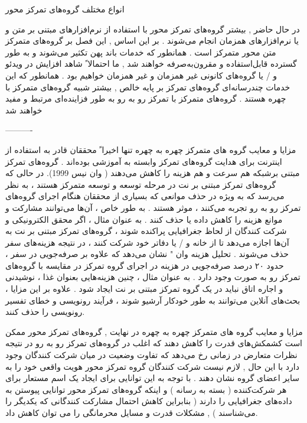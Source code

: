 \documentclass{beamer}
\begin{document}
\begin{persian}
\begin{frame}{انواع مختلف گروه‌های تمرکز محور}

در حال حاضر , بیشتر گروه‌های تمرکز محور با استفاده از نرم‌افزارهای مبتنی بر متن و یا نرم‌افزارهای همزمان انجام می‌شوند . بر این اساس , این فصل بر گروه‌های متمرکز متن محور متمرکز است . همانطور که خدمات باند پهن تکثیر می‌شوند و به طور گسترده قابل‌استفاده و مقرون‌به‌صرفه خواهند شد , ما احتمالا ً شاهد افزایش در ویدئو و / یا گروه‌های کانونی غیر همزمان و غیر همزمان خواهیم بود . همانطور که این خدمات چندرسانه‌ای گروه‌های تمرکز بر پایه خالص , بیشتر شبیه گروه‌های متمرکز با چهره هستند . گروه‌های متمرکز با تمرکز رو به رو به طور فزاینده‌ای مرتبط و مفید خواهند شد


\end{frame}

----------
\begin{frame}{مزایا و معایب گروه های متمرکز چهره به چهره }
تنها اخیرا ً محققان قادر به استفاده از اینترنت برای هدایت گروه‌های تمرکز وابسته به آموزشی بوده‌اند . گروه‌های تمرکز مبتنی برشبکه هم سرعت و هم هزینه را کاهش می‌دهند ( وان نیس 1999). در حالی که گروه‌های تمرکز مبتنی بر نت در مرحله توسعه و توسعه متمرکز هستند ، به نظر می‌رسد که به ویژه در حذف موانعی که بسیاری از محققان هنگام اجرای گروه‌های تمرکز رو به رو تجربه می‌کنند ، موثر هستند . به طور خاص ، آن‌ها می‌توانند مشارکت و موانع هزینه را کاهش داده یا حذف کنند . به عنوان مثال ، اگر محقق الکترونیکی و شرکت کنندگان از لحاظ جغرافیایی پراکنده شوند ، گروه‌های تمرکز مبتنی بر نت به آن‌ها اجازه می‌دهد تا از خانه و / یا دفاتر خود شرکت کنند ، در نتیجه هزینه‌های سفر حذف می‌شوند . تحلیل هزینه وان " نشان می‌دهد که علاوه بر صرفه‌جویی در سفر ، حدود ۲۰ درصد صرفه‌جویی در هزینه در اجرای گروه تمرکز در مقایسه با گروه‌های تمرکز رو به صورت وجود دارد . به عنوان مثال ، چنین هزینه‌هایی بعنوان غذا ، نوشیدنی و اجاره اتاق نباید در یک گروه تمرکز مبتنی بر نت ایجاد شود . علاوه بر این مزایا ، بحث‌های آنلاین می‌توانند به طور خودکار آرشیو شوند ، فرآیند رونویسی و خطای تفسیر رونویسی را حذف کنند. 
\end{frame}

\begin{frame}{مزایا و معایب گروه های متمرکز چهره به چهره }
	در نهایت , گروه‌های تمرکز محور ممکن است کشمکش‌های قدرت را کاهش دهند که اغلب در گروه‌های تمرکز رو به رو در نتیجه نظرات متعارض در زمانی رخ می‌دهد که تفاوت وضعیت در میان شرکت کنندگان وجود دارد با این حال , لازم نیست شرکت کنندگان گروه تمرکز محور هویت واقعی خود را به سایر اعضای گروه نشان دهند . با توجه به این توانایی برای ایجاد یک اسم مستعار برای هر شرکت‌کننده ( بسته به رسانه ) و اینکه گروه‌های تمرکز محور توانایی پیوستن به داده‌های جغرافیایی را دارند ( بنابراین کاهش احتمال مشارکت کنندگانی که یکدیگر را می‌شناسند ) , مشکلات قدرت و مسایل محرمانگی را می ‌توان کاهش داد. 
\end{frame}


\end{persian}
\end{document}
